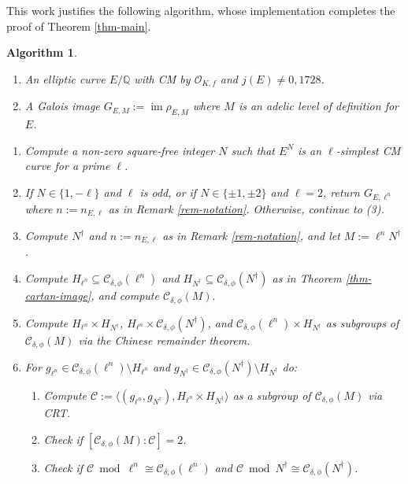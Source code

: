 \documentclass[11pt]{amsart}
\newtheorem{algorithm}[defn]{Algorithm}
\theoremstyle{definition}
\newcommand{\Q}{\mathbb{Q}}
\newcommand{\Of}{\mathcal{O}_{K,f}}
\DeclareMathOperator{\im}{im}  %
\begin{document}
This work justifies the following algorithm, whose implementation completes the proof of Theorem \ref{thm-main}.

\begin{algorithm} \label{alg-main}
    \mbox{}
        \begin{enumerate}[leftmargin=6em]
        \item[\textsc{Input:}] An elliptic curve $E/\Q$ with CM by $\Of$ and $j(E) \neq 0, 1728$.
        \item[\textsc{Output:}] A Galois image $G_{E,M} := \im \rho_{E,M}$ where $M$ is an adelic level of definition for $E$.
    \end{enumerate}

    \begin{enumerate}
        \item Compute a non-zero square-free integer $N$ such that $E^N$ is an $\ell$-simplest CM curve for a prime $\ell$.
        \item If $N \in \{1, - \ell\}$ and $\ell$ is odd, or if $N \in \{\pm 1, \pm 2 \}$ and $\ell = 2$, return $G_{E, \ell^n}$ where $n := n_{E, \ell}$ as in Remark \ref{rem-notation}. Otherwise, continue to (3).
        \item Compute $N^{\dagger}$ and $n := n_{E, \ell}$ as in Remark \ref{rem-notation}, and let $M := \ell^{n} N^\dagger$.
        \item Compute $H_{\ell^n} \subseteq \mathcal{C}_{\delta, \phi}(\ell^n)$ and $H_{N^\dagger} \subseteq \mathcal{C}_{\delta, \phi}(N^\dagger)$ as in Theorem \ref{thm-cartan-image}, and compute $\mathcal{C}_{\delta, \phi}(M).$ 
        \item Compute $H_{\ell^n} \times H_{N^\dagger}$, $H_{\ell^n}\times \mathcal{C}_{\delta, \phi}(N^\dagger)$, and  $\mathcal{C}_{\delta, \phi}(\ell^n) \times H_{N^\dagger}$ as subgroups of $\mathcal{C}_{\delta, \phi}(M)$ via the Chinese remainder theorem.
        \item For $g_{\ell^{n}} \in \mathcal{C}_{\delta, \phi}(\ell^n) \setminus H_{\ell^n}$ and $g_{N^\dagger} \in \mathcal{C}_{\delta, \phi}(N^\dagger) \setminus H_{N^\dagger}$ do:
        \begin{enumerate}
            \item Compute $\mathcal{C} := \langle (g_{\ell^n}, g_{N^\dagger} ), H_{\ell^n} \times H_{N^\dagger} \rangle$ as a subgroup of $\mathcal{C}_{\delta, \phi}(M)$ via CRT.
            \item Check if $[\mathcal{C}_{\delta, \phi}(M) : \mathcal{C}] = 2$.
            \item Check if $\mathcal{C} \bmod \ell^n \cong \mathcal{C}_{\delta, \phi}(\ell^n)$ and $\mathcal{C} \bmod N^\dagger \cong \mathcal{C}_{\delta, \phi}(N^\dagger)$.

\end{enumerate}
\end{enumerate}
\end{algorithm}
\end{document}

